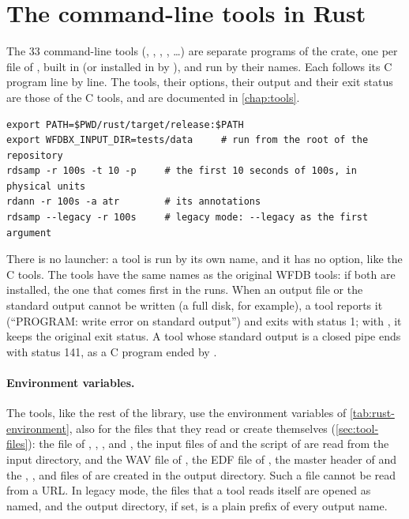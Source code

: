 \section{The command-line tools in Rust}
\label{sec:rust-tools}

The 33 command-line tools (, , , ,
\ldots) are separate programs of the crate, one per file of , built in
 (or installed in  by
), and run by their names. Each follows its C program line by line.
The tools, their options, their output and their exit status are those of the C tools,
and are documented in \cref{chap:tools}.

\begin{lstlisting}[style=shell]
export PATH=$PWD/rust/target/release:$PATH
export WFDBX_INPUT_DIR=tests/data     # run from the root of the repository
rdsamp -r 100s -t 10 -p     # the first 10 seconds of 100s, in physical units
rdann -r 100s -a atr        # its annotations
rdsamp --legacy -r 100s     # legacy mode: --legacy as the first argument
\end{lstlisting}

There is no launcher: a tool is run by its own name, and it has no 
option, like the C tools. The tools have the same names as the original WFDB tools: if
both are installed, the one that comes first in the  runs. When an output file
or the standard output cannot be written (a full disk, for example), a tool reports it
(``PROGRAM: write error on standard output'') and exits with status 1; with
, it keeps the original exit status. A tool whose standard output is a
closed pipe ends with status 141, as a C program ended by .

\paragraph{Environment variables.} The tools, like the rest of the library, use the
environment variables of \cref{tab:rust-environment}, also for the files that they read
or create themselves (\cref{sec:tool-files}): the  file of ,
, ,  and , the input files of
 and the  script of  are read from the input directory,
and the WAV file of , the EDF file of , the master header of
 and the , ,  and  files of
 are created in the output directory. Such a file cannot be read from a URL.
In legacy mode, the files that a tool reads itself are opened as named, and the output
directory, if set, is a plain prefix of every output name.

